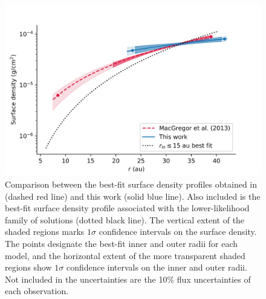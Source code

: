 \documentclass[modern]{aastex62}
\begin{document}
\begin{figure}
  \includegraphics[width=\linewidth]{../figures/surface_density}
  \caption{
    Comparison between the best-fit surface density profiles obtained in \citet{macgregor13} (dashed red line) and this work (solid blue line).
    Also included is the best-fit surface density profile associated with the lower-likelihood family of solutions (dotted black line).
    The vertical extent of the shaded regions marks $1\sigma$ confidence intervals on the surface density. 
    The points designate the best-fit inner and outer radii for each model, and the horizontal extent of the more transparent shaded regions show $1 \sigma$ confidence intervals on the inner and outer radii.
    Not included in the uncertainties are the 10\% flux uncertainties of each observation.
    }
  \label{fig surface_density}
\end{figure}
\end{document}
